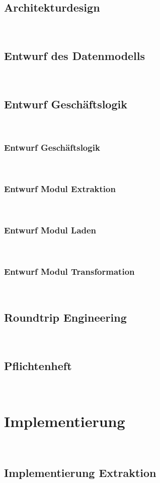 \documentclass[12pt,toc=sectionentrywithoutdots, headheight=44pt, headings=optiontoheadandtoc]{scrartcl}
\begin{document}
\subsection{Architekturdesign}
\blindtext\

\subsection{Entwurf des Datenmodells}
\blindtext\

\subsection{Entwurf Geschäftslogik}
\blindtext\

\subsubsection{Entwurf Geschäftslogik}
\blindtext\

\subsubsection{Entwurf Modul Extraktion}
\blindtext\

\subsubsection{Entwurf Modul Laden}
\blindtext\

\subsubsection{Entwurf Modul Transformation}
\blindtext\

\subsection{Roundtrip Engineering}
\blindtext\

\subsection{Pflichtenheft}
\blindtext\

\section{Implementierung}
\blindtext\

\subsection{Implementierung Extraktion}
\blindtext\
\end{document}
